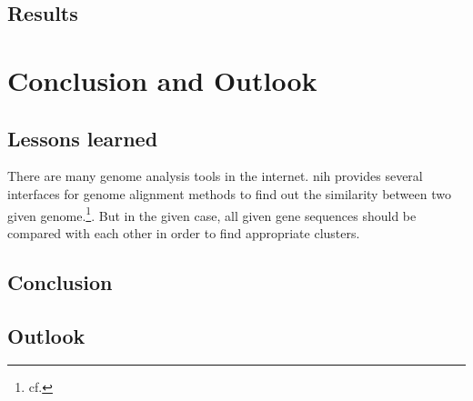 \section{Results}\label{results}


\chapter{Conclusion and Outlook}\label{conclusion_outlook}
\section{Lessons learned}\label{lessons_learned}

There are many genome analysis tools in the internet. \gls{nih} provides several interfaces for genome alignment methods to find out the similarity between two given genome.\footnote{cf.\autocite{blast}}.
But in the given case, all given gene sequences should be compared with each other in order to find appropriate clusters.


\section{Conclusion}\label{conclusion}
\section{Outlook}\label{outlook}	



\newpage






